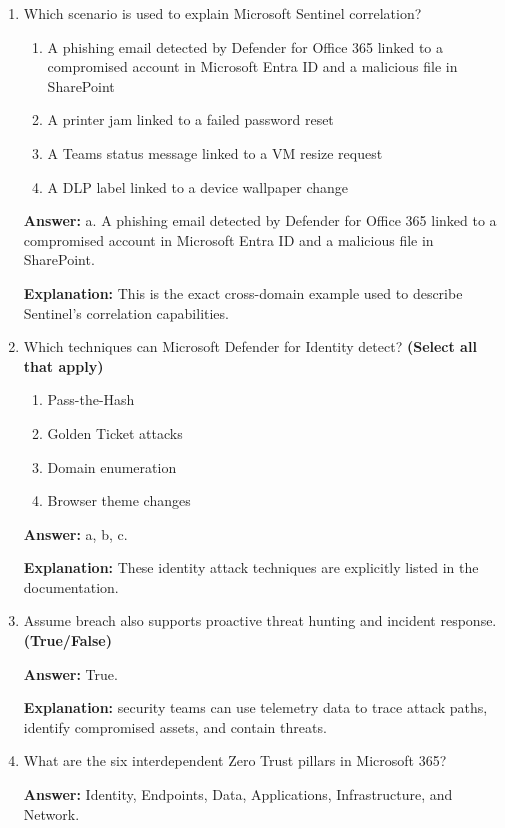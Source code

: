\documentclass[10pt]{article}
\begin{document}
\begin{enumerate}[leftmargin=*]
\textbf{Explanation:} Sentinel uses machine learning to correlate events and identify threats spanning multiple domains.

\item Which scenario is used to explain Microsoft Sentinel correlation?
\begin{enumerate}[label=\alph*., leftmargin=1.5em]
\item A phishing email detected by Defender for Office 365 linked to a compromised account in Microsoft Entra ID and a malicious file in SharePoint
\item A printer jam linked to a failed password reset
\item A Teams status message linked to a VM resize request
\item A DLP label linked to a device wallpaper change
\end{enumerate}
\textbf{Answer:} a. A phishing email detected by Defender for Office 365 linked to a compromised account in Microsoft Entra ID and a malicious file in SharePoint.

\textbf{Explanation:} This is the exact cross-domain example used to describe Sentinel’s correlation capabilities.

\item Which techniques can Microsoft Defender for Identity detect? \textbf{(Select all that apply)}
\begin{enumerate}[label=\alph*., leftmargin=1.5em]
\item Pass-the-Hash
\item Golden Ticket attacks
\item Domain enumeration
\item Browser theme changes
\end{enumerate}
\textbf{Answer:} a, b, c.

\textbf{Explanation:} These identity attack techniques are explicitly listed in the documentation.

\item Assume breach also supports proactive threat hunting and incident response. \textbf{(True/False)}

\textbf{Answer:} True.

\textbf{Explanation:} security teams can use telemetry data to trace attack paths, identify compromised assets, and contain threats.

\item What are the six interdependent Zero Trust pillars in Microsoft 365?

\textbf{Answer:} Identity, Endpoints, Data, Applications, Infrastructure, and Network.


\end{enumerate}
\end{document}
